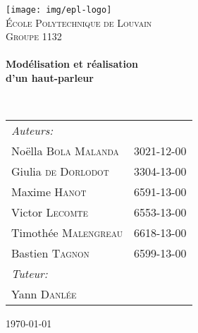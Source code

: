 \begin{titlepage}
\begin{center}

\texttt{[image: img/epl-logo]}~\\[1cm]

\textsc{\LARGE École Polytechnique de Louvain}\\[1cm]

\textsc{\Large Groupe 1132}\\[0.5cm]

\HRule \\[0.3cm]
{ \huge \bfseries Modélisation et réalisation \\ d’un haut-parleur \\[0.3cm] }

\HRule \\[0.8cm]

{\large
\begin{tabu} to 0.67\linewidth {Xl}
    \emph{Auteurs:}\\
    \quad Noëlla \textsc{Bola Malanda} & 3021-12-00\\
    \quad Giulia \textsc{de Dorlodot} & 3304-13-00\\
    \quad Maxime \textsc{Hanot} & 6591-13-00\\
    \quad Victor \textsc{Lecomte} & 6553-13-00\\
    \quad Timothée \textsc{Malengreau} & 6618-13-00\\
    \quad Bastien \textsc{Tagnon} & 6599-13-00\\[.5ex]
    
    \emph{Tuteur:}\\
    \quad Yann \textsc{Danlée}\\
\end{tabu}
}

\vfill

{\large \today}

\end{center}
\end{titlepage}
